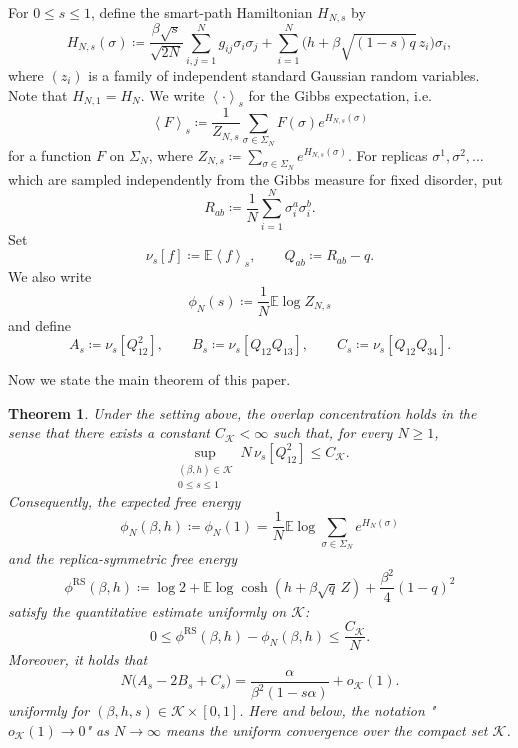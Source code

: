 \documentclass[11pt]{article}
\newtheorem{theorem}{Theorem}[section]
\numberwithin{equation}{section}
\newcommand{\1}{\mathbf 1}
\newcommand{\cK}{\mathcal K}
\newcommand{\braket}[1]{\left\langle #1\right\rangle}
\begin{document}
For $0\le s\le 1$, define the smart-path Hamiltonian $H_{N,s}$ by 
\begin{equation}
 H_{N,s}(\sigma)
 \coloneqq
 \frac{\beta\sqrt s}{\sqrt{2N}}
 \sum_{i,j=1}^Ng_{ij}\sigma_i\sigma_j
 +\sum_{i=1}^N
 \bigl(h+\beta\sqrt{(1-s)q}\,z_i\bigr)\sigma_i,
 \label{eq:path}
\end{equation}
where $(z_i)$ is a family of independent standard Gaussian random variables. Note that $H_{N,1}=H_N.$
We write $\braket{\cdot}_s$ for the Gibbs expectation, i.e. 
\[
\braket{F}_s \coloneqq \frac{1}{Z_{N, s}}\sum _{\sigma \in \Sigma _N} F(\sigma ) e^{H_{N, s}(\sigma)}
\]
for a function $F$ on $\Sigma _N$, where $Z_{N,s} \coloneqq \sum _{\sigma \in \Sigma _N} e^{H_{N,s}(\sigma )}$.
For replicas $\sigma^1,\sigma^2,\ldots$ which are sampled independently from the Gibbs measure for fixed disorder, put
\[
 R_{ab}\coloneqq\frac1N\sum_{i=1}^N\sigma_i^a\sigma_i^b.
\]
Set
\[
 \nu_s[f]\coloneqq\mathbb{E}\braket{f}_s,\qquad
 Q_{ab}\coloneqq R_{ab}-q.
\]
We also write
\begin{equation}
 \phi_N(s)\coloneqq\frac1N\mathbb{E}\log Z_{N,s}
 \label{eq:pathfreeenergy}
\end{equation}
and define
\begin{equation}
 A_s\coloneqq\nu_s[Q_{12}^2],\qquad
 B_s\coloneqq\nu_s[Q_{12}Q_{13}],\qquad
 C_s\coloneqq\nu_s[Q_{12}Q_{34}].
 \label{eq:ABC}
\end{equation}

Now we state the main theorem of this paper.

\begin{theorem}
\label{thm:main}
Under the setting above, the overlap concentration holds in the sense that there exists a constant $C_{\cK}<\infty$ such that, for every $N\ge1$,
\begin{equation}\label{eq:main1}
 \sup_{\substack{(\beta,h)\in\cK\\0\le s\le1}}
 N\,\nu_s[Q_{12}^2]\le C_{\cK}.
\end{equation}
Consequently, the expected free energy 
\[
 \phi_N(\beta,h)\coloneqq \phi_N(1) = 
 \frac1N\mathbb{E}\log\sum_{\sigma\in\Sigma_N}e^{H_N(\sigma)}
\]
and the replica-symmetric free energy
\[
 \phi^{\mathrm{RS}}(\beta,h)
 \coloneqq
 \log2+\mathbb{E}\log\cosh(h+\beta\sqrt q\,Z)
 +\frac{\beta^2}{4}(1-q)^2
\]
satisfy the quantitative estimate uniformly on $\cK$:
\begin{equation}\label{eq:main2}
 0\le\phi^{\mathrm{RS}}(\beta,h)-\phi_N(\beta,h)
 \le\frac{C_{\cK}}N.
\end{equation}
Moreover, it holds that
\begin{equation}\label{eq:main3}
 N\bigl(A_s-2B_s+C_s\bigr)
 =
 \frac{\alpha}{\beta^2(1-s\alpha)}+o_{\cK}(1).
\end{equation}
uniformly for $(\beta,h,s)\in\cK\times[0,1]$.
Here and below, the notation "$o_{\cK}(1)\to0$" as $N\to\infty$ means the uniform convergence over the compact set $\mathcal K$.
\end{theorem}
\end{document}
